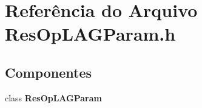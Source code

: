 \section{Referência do Arquivo Res\+Op\+L\+A\+G\+Param.\+h}
\label{_res_op_l_a_g_param_8h}
\subsection*{Componentes}
\begin{DoxyCompactItemize}
\item 
class {\bf Res\+Op\+L\+A\+G\+Param}
\end{DoxyCompactItemize}
